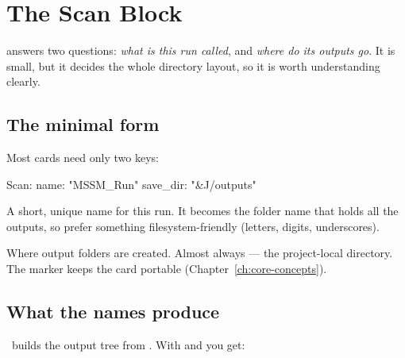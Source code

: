 \chapter{The Scan Block}
\label{ch:scan-block}

 answers two questions: \emph{what is this run called}, and
\emph{where do its outputs go}. It is small, but it decides the whole directory layout, so it is
worth understanding clearly.

\section{The minimal form}
\label{sec:scan-minimal}

Most cards need only two keys:

\begin{yamlwin}
Scan:
  name: "MSSM_Run"
  save_dir: "&J/outputs"
\end{yamlwin}

\begin{description}[style=nextline, leftmargin=1.2em]
  \item[\yamlkey{name}] A short, unique name for this run. It becomes the folder name that holds
        all the outputs, so prefer something filesystem-friendly (letters, digits, underscores).
  \item[\yamlkey{save\_dir}] Where output folders are created. Almost always 
        --- the project-local  directory. The  marker keeps the card
        portable (Chapter~\ref{ch:core-concepts}).
\end{description}

\section{What the names produce}
\label{sec:scan-layout}

\Jarvis\ builds the output tree from . With  and
 you get:

\begin{jfiletree}
\end{jfiletree}


